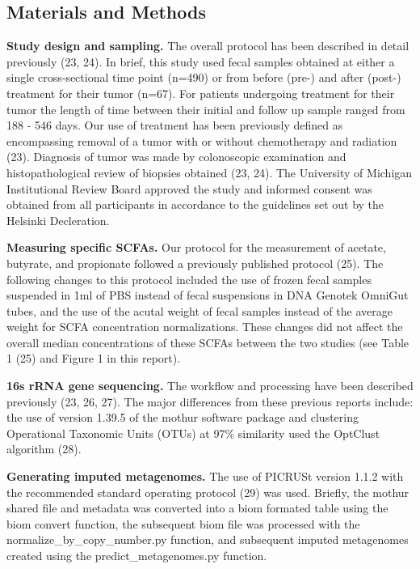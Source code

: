 \documentclass[11pt,]{article}
\begin{document}
\newpage

\subsection{Materials and Methods}\label{materials-and-methods}

\textbf{Study design and sampling.} The overall protocol has been
described in detail previously (23, 24). In brief, this study used fecal
samples obtained at either a single cross-sectional time point (n=490)
or from before (pre-) and after (post-) treatment for their tumor
(n=67). For patients undergoing treatment for their tumor the length of
time between their initial and follow up sample ranged from 188 - 546
days. Our use of treatment has been previously defined as encompassing
removal of a tumor with or without chemotherapy and radiation (23).
Diagnosis of tumor was made by colonoscopic examination and
histopathological review of biopsies obtained (23, 24). The University
of Michigan Institutional Review Board approved the study and informed
consent was obtained from all participants in accordance to the
guidelines set out by the Helsinki Decleration.

\textbf{Measuring specific SCFAs.} Our protocol for the measurement of
acetate, butyrate, and propionate followed a previously published
protocol (25). The following changes to this protocol included the use
of frozen fecal samples suspended in 1ml of PBS instead of fecal
suspensions in DNA Genotek OmniGut tubes, and the use of the acutal
weight of fecal samples instead of the average weight for SCFA
concentration normalizations. These changes did not affect the overall
median concentrations of these SCFAs between the two studies (see Table
1 (25) and Figure 1 in this report).

\textbf{16s rRNA gene sequencing.} The workflow and processing have been
described previously (23, 26, 27). The major differences from these
previous reports include: the use of version 1.39.5 of the mothur
software package and clustering Operational Taxonomic Units (OTUs) at
97\% similarity used the OptClust algorithm (28).

\textbf{Generating imputed metagenomes.} The use of PICRUSt version
1.1.2 with the recommended standard operating protocol (29) was used.
Briefly, the mothur shared file and metadata was converted into a biom
formated table using the biom convert function, the subsequent biom file
was processed with the normalize\_by\_copy\_number.py function, and
subsequent imputed metagenomes created using the predict\_metagenomes.py
function.
\end{document}
